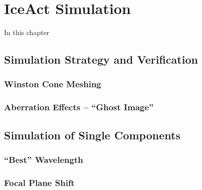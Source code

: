 \chapter{IceAct Simulation}\label{chap:iceact_sim}

In this chapter

\section{Simulation Strategy and Verification}

\subsection{Winston Cone Meshing}\label{sec:wico_meshing}

\subsection{Aberration Effects -- \enquote{Ghost Image}}\label{sec:ghost_image}

\section{Simulation of Single Components}

\subsection{\enquote{Best} Wavelength}

\subsection{Focal Plane Shift}